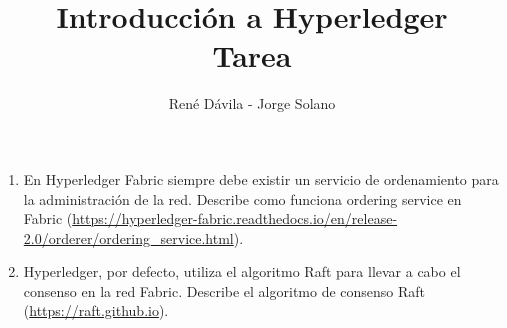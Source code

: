 \documentclass[12pt]{article}
\title{Introducción a Hyperledger\\Tarea}
\author{René Dávila - Jorge Solano}
\date{ }
\begin{document}
	\maketitle
	
	\begin{enumerate}
		\item En Hyperledger Fabric siempre debe existir un servicio de ordenamiento para la administración de la red. Describe como funciona ordering service en Fabric (\url{https://hyperledger-fabric.readthedocs.io/en/release-2.0/orderer/ordering\_service.html}).
		
		\item Hyperledger, por defecto, utiliza el algoritmo Raft para llevar a cabo el consenso en la red Fabric. Describe el algoritmo de consenso Raft (\url{https://raft.github.io}).
	\end{enumerate}
\end{document}
